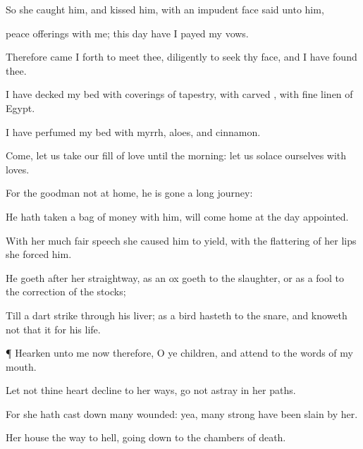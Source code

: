 {So she
caught him, and
kissed him,
{} with an
impudent
face
said unto him,

peace
offerings with me; this
day have I
payed my
vows.

Therefore came I
forth to
meet thee, diligently to
seek thy
face, and I have
found thee.

I have
decked my
bed with
coverings of tapestry, with
carved
{}, with fine
linen of
Egypt.

I have
perfumed my
bed with
myrrh,
aloes, and
cinnamon.

Come, let us take our
fill of
love until the
morning: let us
solace ourselves with
loves.

For the
goodman
{} not at
home, he is
gone a
long
journey:

He hath
taken a
bag of
money with
him,
{} will
come
home at the
day
appointed.

With her
much fair
speech she caused him to
yield, with the
flattering of her
lips she
forced him.

He
goeth
after her
straightway, as an
ox
goeth to the
slaughter, or as a
fool to the
correction of the
stocks;

Till a
dart
strike through his
liver; as a
bird
hasteth to the
snare, and
knoweth not that it
{} for his
life.


\par }{\PP {}¶
Hearken unto me now therefore, O ye
children, and
attend to the
words of my
mouth.

Let not thine
heart
decline to her
ways, go not
astray in her
paths.

For she hath cast
down
many
wounded: yea, many
strong
{} have been
slain by her.

Her
house
{} the
way to
hell, going
down to the
chambers of
death.




\par }

